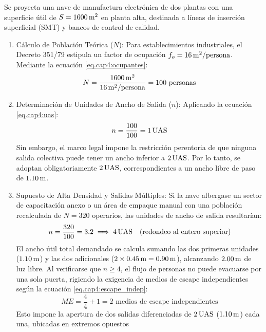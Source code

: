 Se proyecta una nave de manufactura electrónica de dos plantas con una superficie útil de $S = 1600\,\mathrm{m}^2$ en planta alta,
destinada a líneas de inserción superficial (SMT) y bancos de control de calidad.

\begin{enumerate}
    \item Cálculo de Población Teórica ($N$): Para establecimientos industriales, el Decreto 351/79 estipula un factor de
          ocupación $f_o = 16\,\mathrm{m}^2/\text{persona}$. Mediante la ecuación \ref{eq.cap4:ocupantes}:
          \begin{equation}
          N = \frac{1600\,\mathrm{m}^2}{16\,\mathrm{m}^2/\text{persona}} = 100 \text{ personas}
          \end{equation}
    \item Determinación de Unidades de Ancho de Salida ($n$): Aplicando la ecuación \ref{eq.cap4:uas}:
          \begin{equation}
          n = \frac{100}{100} = 1\,\mathrm{UAS}
          \end{equation}
          Sin embargo, el marco legal impone la restricción perentoria de que ninguna salida colectiva puede tener un ancho
          inferior a $2\,\mathrm{UAS}$. Por lo tanto, se adoptan obligatoriamente $2\,\mathrm{UAS}$, correspondientes a un ancho libre de paso
          de $1.10\,\mathrm{m}$.
    \item Supuesto de Alta Densidad y Salidas Múltiples: Si la nave albergase un sector de capacitación anexo o un área de
          empaque manual con una población recalculada de $N = 320$ operarios, las unidades de ancho de salida resultarían:
          \begin{equation}
          n = \frac{320}{100} = 3.2 \implies 4\,\mathrm{UAS} \quad (\text{redondeo al entero superior})
          \end{equation}
          El ancho útil total demandado se calcula sumando las dos primeras unidades ($1.10\,\mathrm{m}$) y las dos adicionales
          ($2 \times 0.45\,\mathrm{m} = 0.90\,\mathrm{m}$), alcanzando $2.00\,\mathrm{m}$ de luz libre. Al verificarse que $n \ge 4$, el flujo de personas
          no puede evacuarse por una sola puerta, rigiendo la exigencia de medios de escape independientes según la
          ecuación \ref{eq.cap4:escape_indep}:
          \begin{equation}
          ME = \frac{4}{4} + 1 = 2 \text{ medios de escape independientes}
          \end{equation}
          Esto impone la apertura de dos salidas diferenciadas de $2\,\mathrm{UAS}$ ($1.10\,\mathrm{m}$) cada una, ubicadas en extremos opuestos

\end{enumerate}
